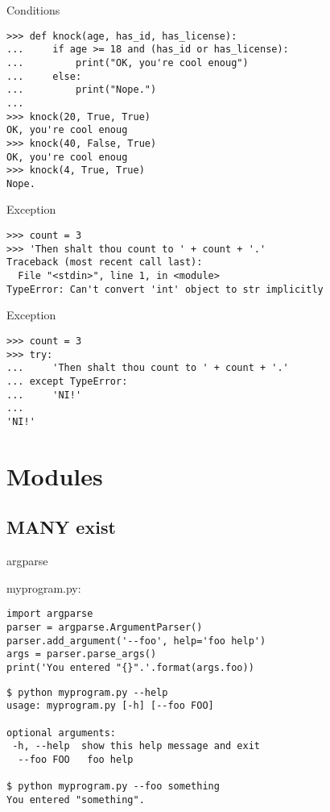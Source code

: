\documentclass[ignorenonframetext,]{beamer}
\begin{document}
\begin{frame}[fragile]{Conditions}
    \begin{verbatim}
>>> def knock(age, has_id, has_license):
...     if age >= 18 and (has_id or has_license):
...         print("OK, you're cool enoug")
...     else:
...         print("Nope.")
...
>>> knock(20, True, True)
OK, you're cool enoug
>>> knock(40, False, True)
OK, you're cool enoug
>>> knock(4, True, True)
Nope.
    \end{verbatim}
\end{frame}

\begin{frame}[fragile]{Exception}
    \begin{verbatim}
>>> count = 3
>>> 'Then shalt thou count to ' + count + '.'
Traceback (most recent call last):
  File "<stdin>", line 1, in <module>
TypeError: Can't convert 'int' object to str implicitly
    \end{verbatim}
\end{frame}

\begin{frame}[fragile]{Exception}
    \begin{verbatim}
>>> count = 3
>>> try:
...     'Then shalt thou count to ' + count + '.'
... except TypeError:
...     'NI!'
...
'NI!'
    \end{verbatim}
\end{frame}

\section{Modules}
\subsection{MANY exist}

\begin{frame}[fragile]{argparse}

    myprogram.py:
    \begin{verbatim}
import argparse
parser = argparse.ArgumentParser()
parser.add_argument('--foo', help='foo help')
args = parser.parse_args()
print('You entered "{}".'.format(args.foo))
    \end{verbatim}

    \begin{tcolorbox}
        \begin{Verbatim}[fontsize=\small]
$ python myprogram.py --help
usage: myprogram.py [-h] [--foo FOO]

optional arguments:
 -h, --help  show this help message and exit
  --foo FOO   foo help

$ python myprogram.py --foo something
You entered "something".
        \end{Verbatim}
    \end{tcolorbox}
\end{frame}
\end{document}
